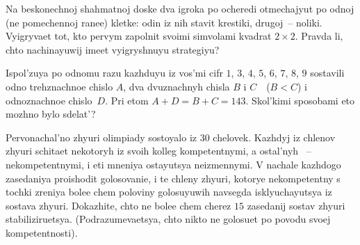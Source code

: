 \prob %
Na beskonechnoj shahmatnoj doske dva igroka po ocheredi
otmechajyut po odnoj (ne pomechennoj ranee) kletke:
odin iz nih stavit krestiki,
drugoj~-- noliki. Vyigryvaet tot, kto pervym zapolnit svoimi
simvolami kvadrat                                                            
                 $2\times 2$.                        
Pravda li, chto nachinayuwij imeet vyigryshnuyu strategiyu?                    
           



\prob   %
%                                                                     
Ispol'zuya po odnomu razu kazhduyu iz vos'mi cifr            
$1$, $3$, $4$, $5$, $6$, $7$, $8$, $9$
sostavili odno trehznachnoe chislo $A$, dva dvuznachnyh chisla $B$
i $C$\ \ ($B<C$) i odnoznachnoe chislo~$D$. Pri etom 
$A+D=B+C=143$. Skol'kimi sposobami eto mozhno bylo sdelat'?

\prob %
Pervonachal'no zhyuri olimpiady sostoyalo iz    30 chelovek.
Kazhdyj iz chlenov zhyuri schitaet nekotoryh iz svoih kolleg
kompetentnymi, a ostal'nyh ~--nekompetentnymi, i eti mneniya
ostayut${}$sya neizmennymi. V nachale kazhdogo zasedaniya
prois${}$hodit golosovanie, i te chleny zhyuri, kotorye nekompetentny
s tochki zreniya bolee chem poloviny golosuyuwih navsegda
isklyuchayut${}$sya iz sostava zhyuri. Dokazhite, chto ne bolee chem
cherez $15$ zasedanij sostav zhyuri stabiliziruet${}$sya.
(Podrazumevaet${}$sya,
chto nikto ne golosuet po povodu svoej kompetentnosti).
                           
                                                                      
                                      
                                                              
                                                          
                                                                  
                                           
                                                               
                         
                                                                  
                           




